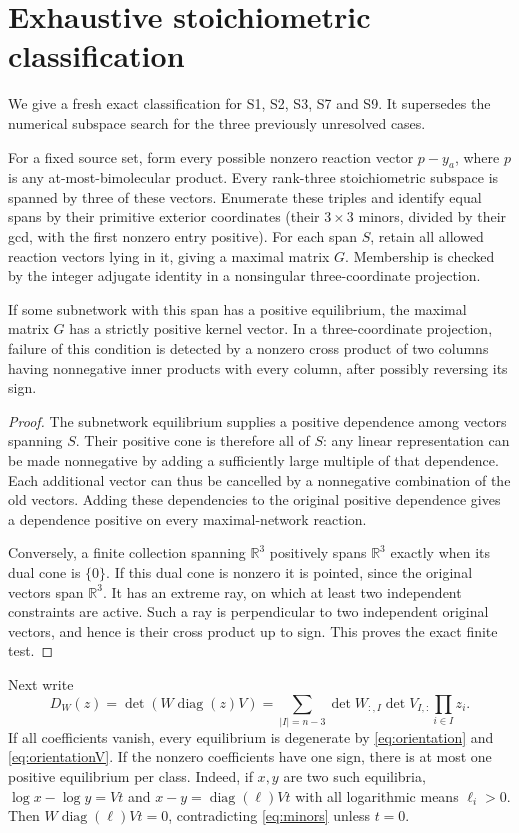 \documentclass[11pt,a4paper]{report}
\providecommand{\R}{\mathbb R}
\providecommand{\diag}{\operatorname{diag}}
\begin{document}
\section{Exhaustive stoichiometric classification}
We give a fresh exact classification for S1, S2, S3, S7 and S9. It supersedes the numerical subspace
search for the three previously unresolved cases.

For a fixed source set, form every possible nonzero reaction vector $p-y_a$, where $p$ is any
at-most-bimolecular product. Every rank-three stoichiometric subspace is spanned by three of these
vectors. Enumerate these triples and identify equal spans by their primitive exterior coordinates
(their $3\times3$ minors, divided by their gcd, with the first nonzero entry positive).
For each span $S$, retain all allowed reaction vectors lying in it, giving a maximal matrix $G$.
Membership is checked by the integer adjugate identity in a nonsingular three-coordinate projection.

\begin{lemma}\label{lem:maximal}
If some subnetwork with this span has a positive equilibrium, the maximal matrix $G$ has a strictly
positive kernel vector. In a three-coordinate projection, failure of this condition is detected by
a nonzero cross product of two columns having nonnegative inner products with every column,
after possibly reversing its sign.
\end{lemma}
\begin{proof}
The subnetwork equilibrium supplies a positive dependence among vectors spanning $S$. Their positive
cone is therefore all of $S$: any linear representation can be made nonnegative by adding a sufficiently
large multiple of that dependence. Each additional vector can thus be cancelled by a nonnegative
combination of the old vectors. Adding these dependencies to the original positive dependence gives
a dependence positive on every maximal-network reaction.

Conversely, a finite collection spanning $\R^3$ positively spans $\R^3$ exactly when its dual cone is
$\{0\}$. If this dual cone is nonzero it is pointed, since the original vectors span $\R^3$.
It has an extreme ray, on which at least two independent constraints are active. Such a ray is
perpendicular to two independent original vectors, and hence is their cross product up to sign.
This proves the exact finite test.
\end{proof}

Next write
\begin{equation}\label{eq:minors}
 D_W(z)=\det(W\diag(z)V)
       =\sum_{|I|=n-3}\det W_{:,I}\det V_{I,:}\prod_{i\in I}z_i.
\end{equation}
If all coefficients vanish, every equilibrium is degenerate by \eqref{eq:orientation} and
\eqref{eq:orientationV}. If the nonzero coefficients have one
sign, there is at most one positive equilibrium per class. Indeed, if $x,y$ are two such equilibria,
$\log x-\log y=Vt$ and $x-y=\diag(\ell)Vt$ with all logarithmic means $\ell_i>0$.
Then $W\diag(\ell)Vt=0$, contradicting \eqref{eq:minors} unless $t=0$.
\end{document}
